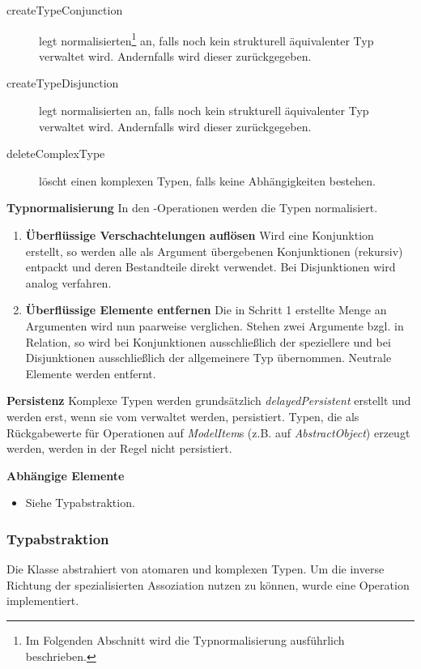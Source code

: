 \begin{description}
\item[createTypeConjunction] legt normalisierten\footnote{Im Folgenden Abschnitt wird die Typnormalisierung ausführlich beschrieben.}  an, falls noch kein strukturell äquivalenter Typ verwaltet wird. Andernfalls wird dieser zurückgegeben.
\item[createTypeDisjunction] legt normalisierten  an, falls noch kein strukturell äquivalenter Typ verwaltet wird. Andernfalls wird dieser zurückgegeben.
\item[deleteComplexType] löscht einen komplexen Typen, falls keine Abhängigkeiten bestehen.
\end{description}


\textbf{Typnormalisierung} \newline
In den -Operationen werden die Typen normalisiert. 
\begin{enumerate}
\item \textbf{Überflüssige Verschachtelungen auflösen}  \newline 
	Wird eine Konjunktion erstellt, so werden alle als Argument übergebenen Konjunktionen (rekursiv) entpackt und deren Bestandteile direkt verwendet.
	Bei Disjunktionen wird analog verfahren. 
\item \textbf{Überflüssige Elemente entfernen}  \newline 
	Die in Schritt 1 erstellte Menge an Argumenten wird nun paarweise verglichen. Stehen zwei Argumente bzgl.  in Relation, so wird 
	bei Konjunktionen ausschließlich der speziellere und bei Disjunktionen ausschließlich der allgemeinere Typ übernommen. Neutrale Elemente werden 
	entfernt. 
\end{enumerate} 

\textbf{Persistenz} \newline
Komplexe Typen werden grundsätzlich \emph{delayedPersistent} erstellt und werden erst, wenn sie vom  verwaltet werden, persistiert. 
Typen, die als Rückgabewerte für Operationen auf \emph{ModelItem}s (z.B.  auf \emph{AbstractObject}) erzeugt werden, 
werden in der Regel nicht persistiert. 

\textbf{Abhängige Elemente}
\begin{itemize}
	\item Siehe Typabstraktion.
\end{itemize}

\subsubsection{Typabstraktion}
Die Klasse  abstrahiert von atomaren und komplexen Typen. Um die inverse Richtung der spezialisierten Assoziation 
 nutzen zu können, wurde eine Operation  implementiert. 


